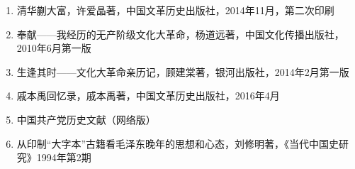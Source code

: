\documentclass[../dazhuan.tex]{subfiles}
\begin{document}
\begin{enumerate}
\item 清华蒯大富，许爱晶著，中国文革历史出版社，2014年11月，第二次印刷

\item 奉献——我经历的无产阶级文化大革命，杨道远著，中国文化传播出版社，2010年6月第一版

\item 生逢其时——文化大革命亲历记，顾建棠著，银河出版社，2014年2月第一版

\item 戚本禹回忆录，戚本禹著，中国文革历史出版社，2016年4月

\item 中国共产党历史文献（网络版）

\item 从印制“大字本”古籍看毛泽东晚年的思想和心态，刘修明著，《当代中国史研究》1994年第2期

\end{enumerate}
\end{document}

